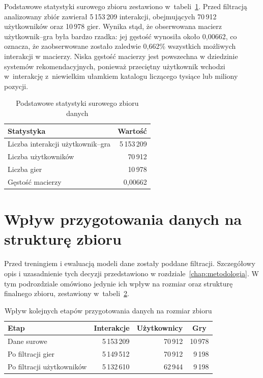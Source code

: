 Podstawowe statystyki surowego zbioru zestawiono w~tabeli~\ref{tab:raw_data_basic_stats}. Przed filtracją analizowany zbiór zawierał 5\,153\,209 interakcji, obejmujących 70\,912 użytkowników oraz 10\,978 gier. Wynika stąd, że obserwowana macierz użytkownik--gra była bardzo rzadka: jej gęstość wynosiła około 0{,}00662, co oznacza, że zaobserwowane zostało zaledwie 0{,}662\% wszystkich możliwych interakcji w macierzy. Niska gęstość macierzy jest powszechna w dziedzinie systemów rekomendacyjnych, ponieważ przeciętny użytkownik wchodzi w~interakcję z~niewielkim ułamkiem katalogu liczącego tysiące lub miliony pozycji.

\begin{table}[htbp]
\centering
\caption{Podstawowe statystyki surowego zbioru danych}
\label{tab:raw_data_basic_stats}
\begin{tabular}{lr}
\toprule
Statystyka & \multicolumn{1}{c}{Wartość} \\
\midrule
Liczba interakcji użytkownik--gra & 5\,153\,209 \\
Liczba użytkowników & 70\,912 \\
Liczba gier & 10\,978 \\
Gęstość macierzy & 0{,}00662 \\
\bottomrule
\end{tabular}
\end{table}

\section{Wpływ przygotowania danych na strukturę zbioru}

Przed treningiem i ewaluacją modeli dane zostały poddane filtracji. Szczegółowy opis i uzasadnienie tych decyzji przedstawiono w rozdziale~\ref{chap:metodologia}. W tym podrozdziale omówiono jedynie ich wpływ na rozmiar oraz strukturę finalnego zbioru, zestawiony w~tabeli~\ref{tab:data_preparation_effect}.

\begin{table}[htbp]
\centering
\caption{Wpływ kolejnych etapów przygotowania danych na rozmiar zbioru}
\label{tab:data_preparation_effect}
\begin{tabular}{lrrr}
\toprule
Etap & \multicolumn{1}{c}{Interakcje} & \multicolumn{1}{c}{Użytkownicy} & \multicolumn{1}{c}{Gry} \\
\midrule
Dane surowe & 5\,153\,209 & 70\,912 & 10\,978 \\
Po filtracji gier & 5\,149\,512 & 70\,912 & 9\,198 \\
Po filtracji użytkowników & 5\,132\,610 & 62\,944 & 9\,198 \\
\bottomrule
\end{tabular}
\end{table}

